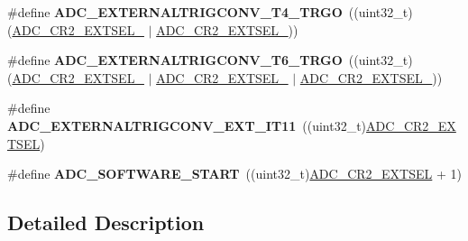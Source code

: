 \begin{DoxyCompactItemize}
\item 
\mbox{\label{group___a_d_c___external__trigger___source___regular_gaec1f9d0b9040535e70ba9e26d07df768}} 
\#define {\bfseries A\+D\+C\+\_\+\+E\+X\+T\+E\+R\+N\+A\+L\+T\+R\+I\+G\+C\+O\+N\+V\+\_\+\+T4\+\_\+\+T\+R\+GO}~((uint32\+\_\+t)(\mbox{\hyperlink{group___peripheral___registers___bits___definition_ga387de6160834197888efa43e164c2db9}{A\+D\+C\+\_\+\+C\+R2\+\_\+\+E\+X\+T\+S\+E\+L\+\_}} $\vert$ \mbox{\hyperlink{group___peripheral___registers___bits___definition_ga5c2322988b5fff19d012d9179d412ad0}{A\+D\+C\+\_\+\+C\+R2\+\_\+\+E\+X\+T\+S\+E\+L\+\_}}))
\item 
\mbox{\label{group___a_d_c___external__trigger___source___regular_gae0a4be77c45699e79a820768a3184886}} 
\#define {\bfseries A\+D\+C\+\_\+\+E\+X\+T\+E\+R\+N\+A\+L\+T\+R\+I\+G\+C\+O\+N\+V\+\_\+\+T6\+\_\+\+T\+R\+GO}~((uint32\+\_\+t)(\mbox{\hyperlink{group___peripheral___registers___bits___definition_ga387de6160834197888efa43e164c2db9}{A\+D\+C\+\_\+\+C\+R2\+\_\+\+E\+X\+T\+S\+E\+L\+\_}} $\vert$ \mbox{\hyperlink{group___peripheral___registers___bits___definition_ga5c2322988b5fff19d012d9179d412ad0}{A\+D\+C\+\_\+\+C\+R2\+\_\+\+E\+X\+T\+S\+E\+L\+\_}} $\vert$ \mbox{\hyperlink{group___peripheral___registers___bits___definition_ga9410c7fd93f6d0b157ede745ee269d7b}{A\+D\+C\+\_\+\+C\+R2\+\_\+\+E\+X\+T\+S\+E\+L\+\_}}))
\item 
\mbox{\label{group___a_d_c___external__trigger___source___regular_gaded75d5ddcb64cf735044cdc753571a9}} 
\#define {\bfseries A\+D\+C\+\_\+\+E\+X\+T\+E\+R\+N\+A\+L\+T\+R\+I\+G\+C\+O\+N\+V\+\_\+\+E\+X\+T\+\_\+\+I\+T11}~((uint32\+\_\+t)\mbox{\hyperlink{group___peripheral___registers___bits___definition_ga6d1054d6cd017e305cf6e8a864ce96c8}{A\+D\+C\+\_\+\+C\+R2\+\_\+\+E\+X\+T\+S\+EL}})
\item 
\mbox{\label{group___a_d_c___external__trigger___source___regular_ga349ec6a1c2a362fba718cbfd068e50dc}} 
\#define {\bfseries A\+D\+C\+\_\+\+S\+O\+F\+T\+W\+A\+R\+E\+\_\+\+S\+T\+A\+RT}~((uint32\+\_\+t)\mbox{\hyperlink{group___peripheral___registers___bits___definition_ga6d1054d6cd017e305cf6e8a864ce96c8}{A\+D\+C\+\_\+\+C\+R2\+\_\+\+E\+X\+T\+S\+EL}} + 1)
\end{DoxyCompactItemize}


\subsection{Detailed Description}
